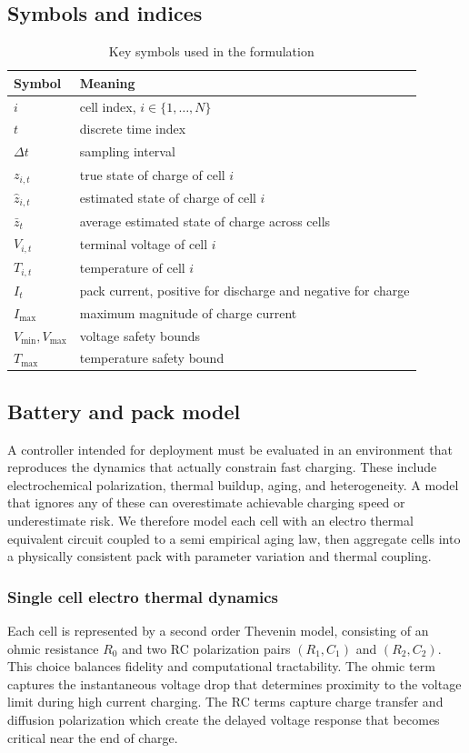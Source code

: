 \documentclass[%
 aip,
 amsmath,amssymb,
reprint, onecolumn %
]{revtex4-1}
\begin{document}
\subsection{Symbols and indices}

\begin{table}[H]
\centering
\caption{Key symbols used in the formulation}
\begin{tabular}{ll}
\hline
Symbol & Meaning \\
\hline
$i$ & cell index, $i \in \{1,\dots,N\}$ \\
$t$ & discrete time index \\
$\Delta t$ & sampling interval \\
$z_{i,t}$ & true state of charge of cell $i$ \\
$\hat z_{i,t}$ & estimated state of charge of cell $i$ \\
$\bar z_t$ & average estimated state of charge across cells \\
$V_{i,t}$ & terminal voltage of cell $i$ \\
$T_{i,t}$ & temperature of cell $i$ \\
$I_t$ & pack current, positive for discharge and negative for charge \\
$I_{\max}$ & maximum magnitude of charge current \\
$V_{\min}, V_{\max}$ & voltage safety bounds \\
$T_{\max}$ & temperature safety bound \\
\hline
\end{tabular}
\end{table}

\subsection{Battery and pack model}
A controller intended for deployment must be evaluated in an environment that reproduces the dynamics that actually constrain fast charging. These include electrochemical polarization, thermal buildup, aging, and heterogeneity. A model that ignores any of these can overestimate achievable charging speed or underestimate risk. We therefore model each cell with an electro thermal equivalent circuit coupled to a semi empirical aging law, then aggregate cells into a physically consistent pack with parameter variation and thermal coupling.

\subsubsection{Single cell electro thermal dynamics}
Each cell is represented by a second order Thevenin model, consisting of an ohmic resistance $R_0$ and two RC polarization pairs $(R_1,C_1)$ and $(R_2,C_2)$. This choice balances fidelity and computational tractability. The ohmic term captures the instantaneous voltage drop that determines proximity to the voltage limit during high current charging. The RC terms capture charge transfer and diffusion polarization which create the delayed voltage response that becomes critical near the end of charge.
\end{document}
